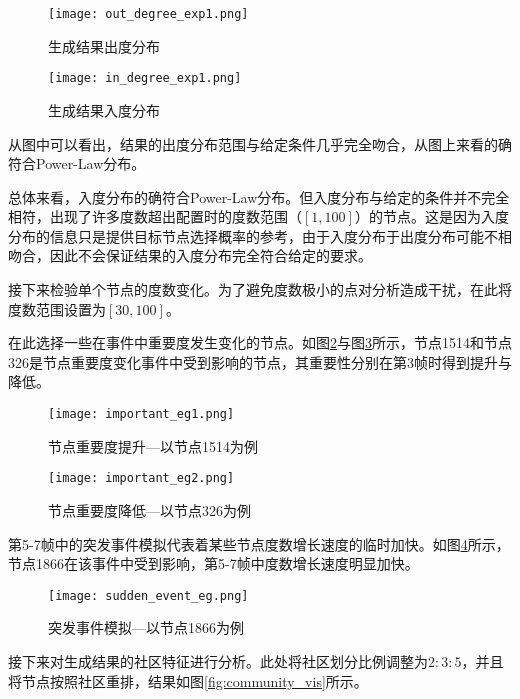 \begin{figure}
\begin{minipage}{0.48\textwidth}
  \centering
  \texttt{[image: out\_degree\_exp1.png]}
  \caption{生成结果出度分布}
  \label{fig:parallel1}
\end{minipage}\hfill
\begin{minipage}{0.48\textwidth}
  \centering
  \texttt{[image: in\_degree\_exp1.png]}
  \caption{生成结果入度分布}
  \label{fig:parallel2}
\end{minipage}
\end{figure}

从图中可以看出，结果的出度分布范围与给定条件几乎完全吻合，从图上来看的确符合Power-Law分布。

总体来看，入度分布的确符合Power-Law分布。但入度分布与给定的条件并不完全相符，出现了许多度数超出配置时的度数范围（$[1, 100]$）的节点。这是因为入度分布的信息只是提供目标节点选择概率的参考，由于入度分布于出度分布可能不相吻合，因此不会保证结果的入度分布完全符合给定的要求。

接下来检验单个节点的度数变化。为了避免度数极小的点对分析造成干扰，在此将度数范围设置为$[30, 100]$。

在此选择一些在事件中重要度发生变化的节点。如图\ref{fig:important_eg1}与图\ref{fig:important_eg2}所示，节点1514和节点326是节点重要度变化事件中受到影响的节点，其重要性分别在第3帧时得到提升与降低。

\begin{figure}[H]
  \centering
  \texttt{[image: important\_eg1.png]}
  \caption{节点重要度提升—以节点1514为例}
  \label{fig:important_eg1}
\end{figure}

\begin{figure}[H]
  \centering
  \texttt{[image: important\_eg2.png]}
  \caption{节点重要度降低—以节点326为例}
  \label{fig:important_eg2}
\end{figure}

第5-7帧中的突发事件模拟代表着某些节点度数增长速度的临时加快。如图\ref{fig:sudden_event_eg}所示，节点1866在该事件中受到影响，第5-7帧中度数增长速度明显加快。

\begin{figure}[H]
  \centering
  \texttt{[image: sudden\_event\_eg.png]}
  \caption{突发事件模拟—以节点1866为例}
  \label{fig:sudden_event_eg}
\end{figure}

接下来对生成结果的社区特征进行分析。此处将社区划分比例调整为$2:3:5$，并且将节点按照社区重排，结果如图\ref{fig:community_vis}所示。

